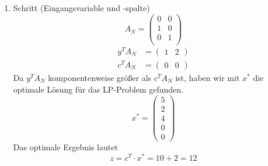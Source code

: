 \documentclass[a4paper]{scrartcl}
\begin{document}
\begin{enumerate}[label=\bfseries\arabic*.]
\begin{enumerate}
\begin{enumerate}[1.]
\begin{enumerate}[1.]
                            \item Schritt (Eingangsvariable und -spalte)
                                \begin{equation}
                                    A_N =
                                    \begin{pmatrix}
                                        0 & 0 \\
                                        1 & 0 \\
                                        0 & 1 \\
                                    \end{pmatrix}
                                \end{equation}
                                \begin{align}
                                    y^TA_N &=
                                    \begin{pmatrix}
                                        1 & 2
                                    \end{pmatrix} \\
                                    c^TA_N &=
                                    \begin{pmatrix}
                                        0 & 0
                                    \end{pmatrix}
                                \end{align}
                                Da $y^TA_N$ komponentenweise größer als $c^TA_N$
                                ist, haben wir mit $x^*$ die optimale Lösung für
                                das LP-Problem gefunden.
                                \begin{equation}
                                    x^* =
                                    \begin{pmatrix}
                                        5 \\ 2 \\ 4 \\ 0 \\ 0
                                    \end{pmatrix}
                                \end{equation}
                                Das optimale Ergebnis lautet
                                \begin{equation}
                                    z = c^T \cdot x^* = 10 + 2 = 12
                                \end{equation}
                                

\end{enumerate}
\end{enumerate}
\end{enumerate}
\end{enumerate}
\end{document}
